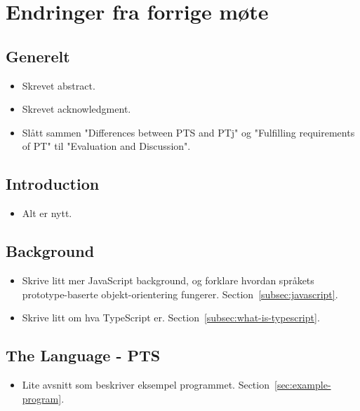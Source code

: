 
\chapter*{Endringer fra forrige møte}

\section*{Generelt}

\begin{itemize}
    \item Skrevet abstract.
    \item Skrevet acknowledgment.
    \item Slått sammen "Differences between PTS and PTj" og "Fulfilling requirements of PT" til "Evaluation and Discussion".
\end{itemize}

\section*{Introduction}

\begin{itemize}
    \item Alt er nytt.
\end{itemize}

\section*{Background}

\begin{itemize}
    \item Skrive litt mer JavaScript background, og forklare hvordan språkets prototype-baserte objekt-orientering fungerer.
    Section~\vref{subsec:javascript}.
    \item Skrive litt om hva TypeScript er.
    Section~\vref{subsec:what-is-typescript}.
\end{itemize}

\section*{The Language - PTS}

\begin{itemize}
    \item Lite avsnitt som beskriver eksempel programmet.
    Section~\vref{sec:example-program}.
\end{itemize}

